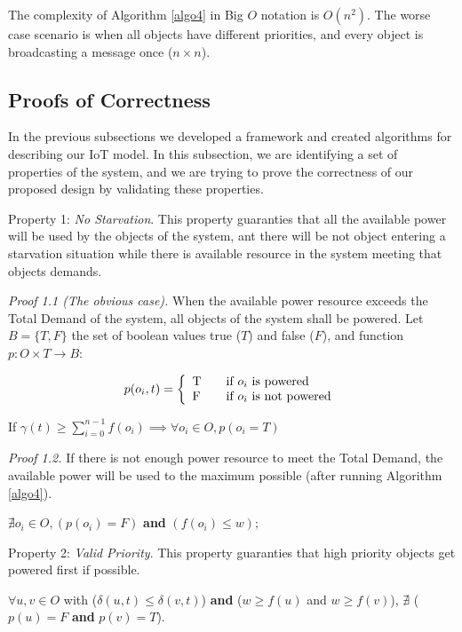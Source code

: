 \documentclass[../main/Self-Stabilization.tex]{subfiles}
\begin{document}
The complexity of Algorithm \ref{algo4} in Big $O$ notation is $O(n^2)$. The worse case scenario is when all objects have different priorities, and every object is broadcasting a message once ($n\times n$).

\subsection{Proofs of Correctness}
In the previous subsections we developed a framework and created algorithms for describing our IoT model. In this subsection, we are identifying a set of properties of the system, and we are trying to prove the correctness of our proposed design by validating these properties.

Property 1: \emph{No Starvation}. This property guaranties that all the available power will be used by the objects of the system, ant there will be not object entering a starvation situation while there is available resource in the system meeting that objects demands.

\emph{Proof 1.1 (The obvious case).} When the available power resource exceeds the Total Demand of the system, all objects of the system shall be powered. Let $B = \{T,F\}$ the set of boolean values true ($T$) and false ($F$), and function $p:O\times T \rightarrow B$:

  \[ p(o_{i}, t)= \left\{
  \begin{array}{l l}
    $T$ & \quad \textrm{if $o_{i}$ is powered}\\
    $F$ & \quad \textrm{if $o_{i}$ is not powered}
  \end{array} \right.\]

\begin{center}
    If $\gamma(t)\geq\sum\limits_{i=0}^{n-1} f(o_i) \implies \forall o_{i}\in O, p(o_{i} = T)$
\end{center}

\emph{Proof 1.2.} If there is not enough power resource to meet the Total Demand, the available power will be used to the maximum possible (after running Algorithm \ref{algo4}). 
\begin{center}
  $\nexists o_{i}\in O, (p(o_{i}) = F)$ \textbf{and} $(f(o_{i})\leq w); $
\end{center}

Property 2: \emph{Valid Priority}. This property guaranties that high priority objects get powered first if possible.
\begin{center}
    $\forall u,v \in O$ with ($\delta(u,t) \le \delta(v,t)$) \textbf{and} ($w\geq f(u)$ and $w\geq f(v)$), $\nexists$ ($ p(u)=F$ \textbf{and} $p(v)=T$).
\end{center}
\end{document}
